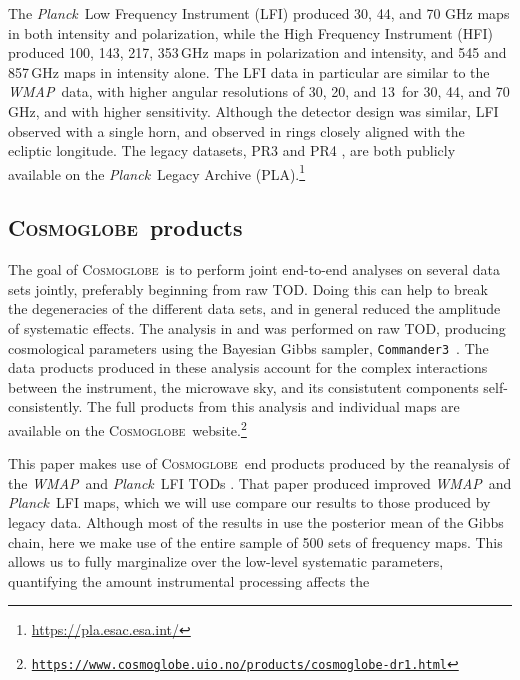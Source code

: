 \documentclass[twocolumn]{../../common/aa}
\def\WMAP{\emph{WMAP}}
\def\Planck{\emph{Planck}}
\def\commanderthree{\texttt{Commander3}}
\newcommand{\cosmoglobe}{\textsc{Cosmoglobe}}
\newcommand{\Cosmoglobe}{\textsc{Cosmoglobe}}
\begin{document}
The \Planck\ Low Frequency Instrument (LFI) produced  30, 44, and 70 GHz maps in both intensity and polarization, while the High Frequency Instrument (HFI) produced 100, 143, 217, 353\,GHz maps in polarization and intensity, and 545 and 857\,GHz maps in intensity alone. The LFI data in particular are similar to the \WMAP\ data, with higher angular resolutions of 30\arcm, 20\arcm, and 13\arcm\ for 30, 44, and 70 GHz, and with higher sensitivity. Although the detector design was similar, LFI observed with a single horn, and observed in rings closely aligned with the ecliptic longitude. The legacy datasets, PR3 \citep{planck2016-l01} and PR4 \citep{planck2020-LVII}, are both publicly available on the \Planck\ Legacy Archive (PLA).\footnote{\url{https://pla.esac.esa.int/}}

\subsection{\Cosmoglobe\ products}
\label{sec:cosmoglobe_data}

The goal of \Cosmoglobe\ is to perform joint end-to-end analyses on several data sets jointly, preferably beginning from raw TOD. Doing this can help to break the degeneracies of the different data sets, and in general reduced the amplitude of systematic effects. The analysis in \citet{bp01} and \citet{watts2023_dr1} was performed on raw TOD, producing  cosmological parameters using the Bayesian Gibbs sampler, \commanderthree\ \citep{bp03}. The data products produced in these analysis account for the complex interactions between the instrument, the microwave sky, and its consistutent components self-consistently. The full products from this analysis and individual maps are available on the \cosmoglobe\ website.\footnote{\href{https://www.cosmoglobe.uio.no/products/cosmoglobe-dr1.html}{\texttt{https://www.cosmoglobe.uio.no/products/\newline cosmoglobe-dr1.html}}}

This paper makes use of \cosmoglobe\ end products produced by the reanalysis of the \WMAP\ and \Planck\ LFI TODs \citep{watts2023_dr1}. That paper produced improved \WMAP\ and \Planck\ LFI maps, which we will use compare our results to those produced by legacy data. 
Although most of the results in \citet{watts2023_dr1} use the posterior mean of the Gibbs chain, here we make use of the entire sample of 500 sets of frequency maps. This allows us to fully marginalize over the low-level systematic parameters, quantifying the amount instrumental processing affects the 
\end{document}
